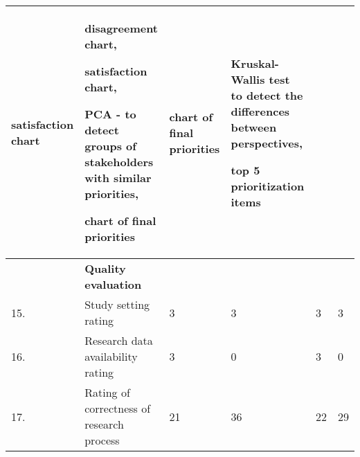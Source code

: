 \begin{table}[h]
{\begin{tabular}{|>{\raggedright}p{}|>{\raggedright}p{}|>{\raggedright}p{}|>{\raggedright}p{}|>{\raggedright}p{}|>{\raggedright}p{}|}
satisfaction chart & 
disagreement chart,

satisfaction chart,

PCA - to detect groups of stakeholders with similar priorities,

chart of final priorities
&
chart of final priorities 
& 
Kruskal-Wallis test to detect the differences between perspectives,

top 5 prioritization items

\tabularnewline
\hline 
 & \textbf{Quality evaluation} &  &  &  & \tabularnewline
\hline 
15. & Study setting rating & 3 & 3 & 3 & 3\tabularnewline
\hline 
16. & Research data availability rating & 3 & 0 & 3 & 0\tabularnewline
\hline 
17. & Rating of correctness of research process & 21 & 36 & 22 & 29\tabularnewline
\hline
\end{tabular}%
}
\end{table}